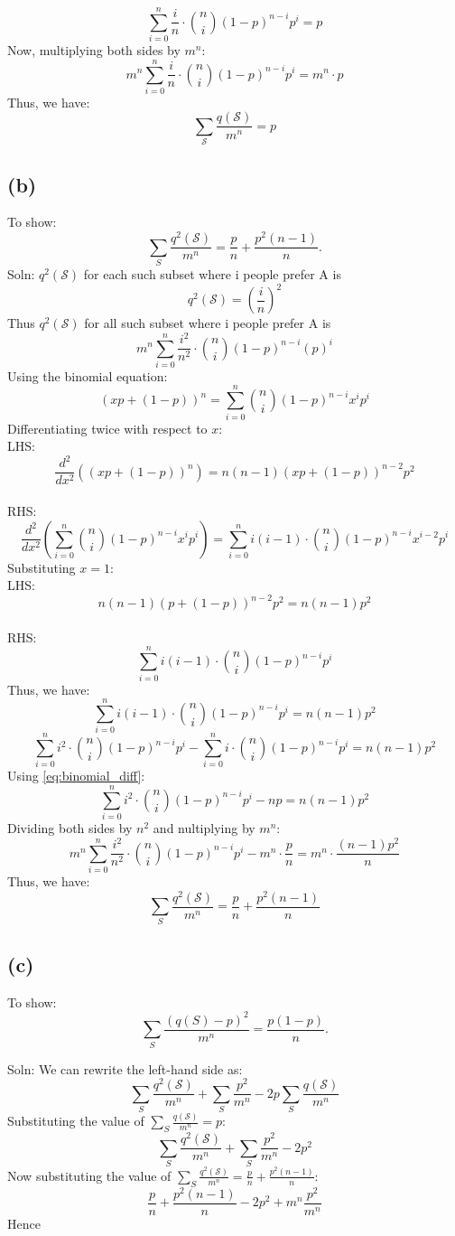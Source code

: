 \documentclass{report}
\begin{document}
\[\sum_{i=0}^{n} \frac{i}{n} \cdot \binom{n}{i}(1-p)^{n-i}p^i = p\]
Now, multiplying both sides by \(m^n\):
\[m^n \sum_{i=0}^{n} \frac{i}{n} \cdot \binom{n}{i}(1-p)^{n-i}p^i = m^n \cdot p\]
Thus, we have:
\[\sum_\mathcal{S} \frac{q(\mathcal{S})}{m^{n}} = p\]

\subsection*{(b)}
To show:
\[
    \sum_{S} \frac{q^{2}(\mathcal{S})}{m^{n}} = \frac{p}{n} + \frac{p^{2}(n-1)}{n}.
\]
Soln:
    \(q^2(\mathcal{S})\) for each such subset where i people prefer A is 
    \[q^2(\mathcal{S}) = (\frac{i}{n})^2\]
    Thus \(q^2(\mathcal{S})\) for all such subset where i people prefer A is
    \[m^n \sum_{i=0}^{n} \frac{i^2}{n^2} \cdot \binom{n}{i}(1-p)^{n - i} (p)^i\]
    Using the binomial equation:
    \[(xp + (1-p))^n = \sum_{i=0}^{n}\binom{n}{i}(1-p)^{n-i}x^i p^i\]
    Differentiating twice with respect to \(x\):
    \\LHS:
    \[\frac{d^2}{dx^2}((xp + (1-p))^n) = n(n-1)(xp + (1-p))^{n-2}p^2 \]
    \\RHS: 
    \[\frac{d^2}{dx^2}(\sum_{i=0}^{n}\binom{n}{i}(1-p)^{n-i}x^i p^i) = \sum_{i=0}^{n} i(i-1) \cdot \binom{n}{i}(1-p)^{n-i}x^{i-2}p^i\]
    Substituting \(x = 1\):
    \\LHS:
    \[n(n-1)(p + (1-p))^{n-2}p^2 = n(n-1)p^2\]
    \\RHS:  
    \[\sum_{i=0}^{n} i(i-1) \cdot \binom{n}{i}(1-p)^{n-i}p^i\]
    Thus, we have:
    \[\sum_{i=0}^{n} i(i-1) \cdot \binom{n}{i}(1-p)^{n-i}p^i = n(n-1)p^2\]
    \[\sum_{i=0}^{n} i^2 \cdot \binom{n}{i}(1-p)^{n-i}p^i - \sum_{i=0}^{n} i \cdot \binom{n}{i}(1-p)^{n-i}p^i = n(n-1)p^2\]
    Using {\ref{eq:binomial_diff}}:
    \[\sum_{i=0}^{n} i^2 \cdot \binom{n}{i}(1-p)^{n-i}p^i -np = n(n-1)p^2\]
    Dividing both sides by \(n^2\) and nultiplying by \(m^n\):
    \[m^n \sum_{i=0}^{n} \frac{i^2}{n^2} \cdot \binom{n}{i}(1-p)^{n-i}p^i - m^n \cdot \frac{p}{n} = m^n \cdot \frac{(n-1)p^2}{n}\]
    Thus, we have:
    \[\sum_{S} \frac{q^{2}(\mathcal{S})}{m^{n}} = \frac{p}{n} + \frac{p^{2}(n-1)}{n}\]

\subsection*{(c)}
To show:
\[
    \sum_{S} \frac{\left(q(S) - p\right)^{2}}{m^{n}} = \frac{p(1-p)}{n}.
\]

Soln:
We can rewrite the left-hand side as:
\[\sum_{S} \frac{q^2(\mathcal{S})}{m^{n}} + \sum_{S} \frac{p^{  2}}{m^{n}} - 2p\sum_{S} \frac{q(\mathcal{S})}{m^{n}}\]
Substituting the value of \(\sum_{S} \frac{q(\mathcal{S})}{m^{n}} = p\):
\[\sum_{S} \frac{q^2(\mathcal{S})}{m^{n}} + \sum_{S} \frac{p^{  2}}{m^{n}} - 2p^{2}\]
Now substituting the value of \(\sum_{S} \frac{q^2(\mathcal{S})}{m^{n}} = \frac{p}{n} + \frac{p^{2}(n-1)}{n}\):
\[\frac{p}{n} + \frac{p^{2}(n-1)}{n} - 2p^{2} + m^{n}\frac{p^{  2}}{m^{n}}\]
Hence
\end{document}

